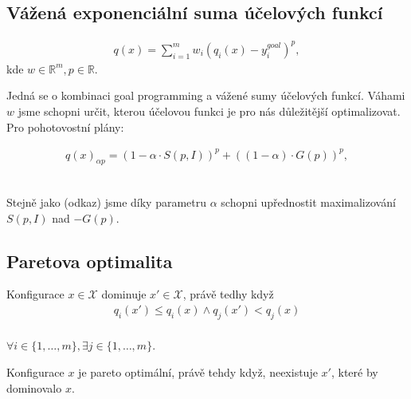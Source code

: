 \subsection{Vážená exponenciální suma účelových funkcí}

\begin{definice}
  \begin{align}
    q(x) = \sum_{i=1}^{m} w_i (q_i(x) - y_i^{goal})^p,
  \end{align}
  kde $w \in \mathbb{R}^m, p \in \mathbb{R}$.
  \\
\end{definice}

Jedná se o kombinaci goal programming a vážené sumy účelových funkcí.
Váhami $w$ jsme schopni určit, kterou účelovou funkci je pro nás důležitější optimalizovat. Pro pohotovostní plány:

\begin{definice}
  \begin{align}
    q(x)_{\alpha p} = (1 - \alpha \cdot S(p, I))^p + ((1 - \alpha) \cdot G(p))^p,
  \end{align}
  \\
\end{definice}

Stejně jako (odkaz) jsme díky parametru $\alpha$ schopni upřednostit maximalizování $S(p, I)$ nad $-G(p)$.

\subsection{Paretova optimalita}

\begin{definice}[Dominance]
  Konfigurace $x \in \mathcal{X}$ dominuje $x' \in \mathcal{X}$, právě tedhy když
  \begin{align}
    q_i(x') \leq q_i(x) \land q_j(x') < q_j(x)
  \end{align}
  \\
$\forall i \in \{ 1, \dots, m \}, \exists j \in \{ 1, \dots, m \}$.
\\
\end{definice}

\begin{definice}
  Konfigurace $x$ je pareto optimální, právě tehdy když, neexistuje $x'$, které by dominovalo $x$.
  \\
\end{definice}

